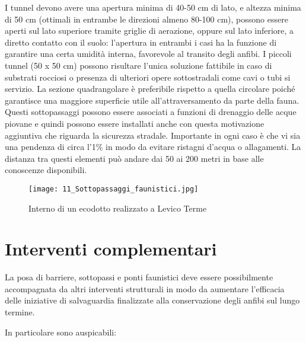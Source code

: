 \documentclass[11pt,a4paper,twoside]{memoir}
\begin{document}
I tunnel devono avere una apertura minima di 40-50 cm di lato, e altezza minima di 50 cm (ottimali in entrambe le direzioni almeno 80-100 cm), possono essere aperti sul lato superiore tramite griglie di aerazione, oppure sul lato inferiore, a diretto contatto con il suolo: l'apertura in entrambi i casi ha la funzione di garantire una certa umidità interna, favorevole al transito degli anfibi. I piccoli tunnel (50 x 50 cm) possono risultare l’unica soluzione fattibile in caso di substrati rocciosi o presenza di ulteriori opere sottostradali come cavi o tubi si servizio. La sezione quadrangolare è preferibile rispetto a quella circolare poiché garantisce una maggiore superficie utile all'attraversamento da parte della fauna. Questi sottopassaggi possono essere associati a funzioni di drenaggio delle acque piovane e quindi possono essere installati anche con questa motivazione aggiuntiva che riguarda la sicurezza stradale. Importante in ogni caso è che vi sia una pendenza di circa l’1\% in modo da evitare ristagni d’acqua o allagamenti. La distanza tra questi elementi può andare dai 50 ai 200 metri in base alle conoscenze disponibili.

\begin{figure}[H]
\label{fig:sottopass2}
\centering
  \texttt{[image: 11\_Sottopassaggi\_faunistici.jpg]}
\caption{Interno di un ecodotto realizzato a Levico Terme}
\end{figure}

\section{Interventi complementari}
La posa di barriere, sottopassi e ponti faunistici deve essere possibilmente accompagnata da altri interventi strutturali in modo da aumentare l'efficacia delle iniziative di salvaguardia finalizzate alla conservazione degli anfibi sul lungo termine.

In particolare sono auspicabili:
\end{document}
